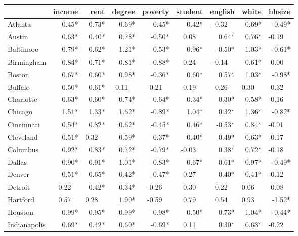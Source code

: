 \fontsize{9.5}{11.1}\selectfont
\begin{tabular}{lrrrrrrrr}
	\toprule
	{}             & income &    rent &  degree & poverty & student & english &   white &  hhsize \\ \midrule
	Atlanta        &  0.45* &   0.73* &   0.69* &  -0.45* &   0.42* & -0.32~~ &   0.69* &  -0.49* \\
	Austin         &  0.63* &   0.40* &   0.78* &  -0.50* &  0.08~~ &   0.64* &   0.76* & -0.19~~ \\
	Baltimore      &  0.79* &   0.62* &   1.21* &  -0.53* &   0.96* &  -0.50* &   1.03* &  -0.61* \\
	Birmingham     &  0.84* &   0.71* &   0.81* &  -0.88* &  0.24~~ & -0.14~~ &   0.61* &  0.00~~ \\
	Boston         &  0.67* &   0.60* &   0.98* &  -0.36* &   0.60* &   0.57* &   1.03* &  -0.98* \\
	Buffalo        &  0.50* &   0.61* &  0.11~~ & -0.21~~ &  0.19~~ &  0.26~~ &  0.30~~ &  0.32~~ \\
	Charlotte      &  0.63* &   0.60* &   0.74* &  -0.64* &   0.34* &   0.30* &   0.58* & -0.16~~ \\
	Chicago        &  1.51* &   1.33* &   1.62* &  -0.89* &   1.04* &   0.32* &   1.36* &  -0.82* \\
	Cincinnati     &  0.54* &   0.82* &   0.62* &  -0.45* &   0.46* &  -0.53* &   0.84* & -0.01~~ \\
	Cleveland      &  0.51* &  0.32~~ &   0.59* &  -0.37* &   0.40* &  -0.49* &   0.63* & -0.17~~ \\
	Columbus       &  0.92* &   0.83* &   0.72* &  -0.79* & -0.03~~ &   0.38* &   0.72* & -0.18~~ \\
	Dallas         &  0.90* &   0.91* &   1.01* &  -0.83* &   0.67* &   0.61* &   0.97* &  -0.49* \\
	Denver         &  0.51* &   0.65* &   0.42* &  -0.47* &  0.27~~ &   0.40* &   0.41* & -0.12~~ \\
	Detroit        & 0.22~~ &   0.42* &   0.34* & -0.26~~ &  0.30~~ &  0.22~~ &  0.06~~ &  0.08~~ \\
	Hartford       & 0.57~~ &  0.28~~ &   1.90* & -0.59~~ &  0.79~~ &  0.54~~ &  0.93~~ &  -1.52* \\
	Houston        &  0.99* &   0.95* &   0.99* &  -0.98* &   0.50* &   0.73* &   1.04* &  -0.44* \\
	Indianapolis   &  0.69* &   0.42* &   0.60* &  -0.69* &  0.11~~ &   0.30* &   0.68* & -0.22~~ \\

\end{tabular}
